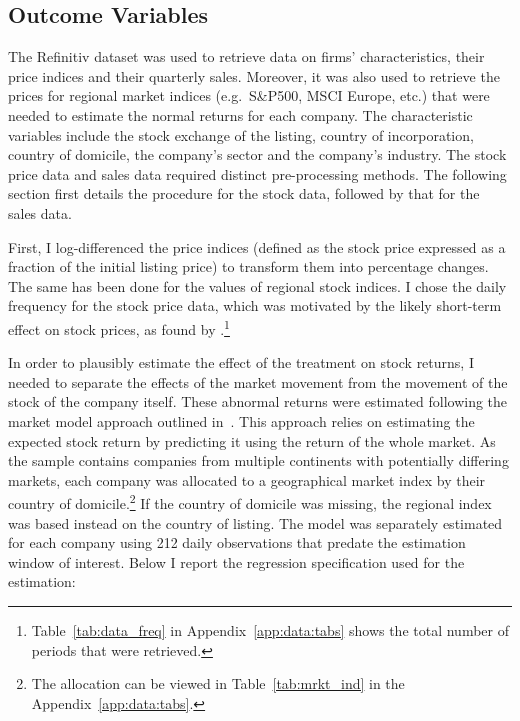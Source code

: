 \documentclass[12pt]{article}
\begin{document}
\subsection{Outcome Variables}

The Refinitiv dataset was used to retrieve data on firms' characteristics, their price indices and their quarterly sales. Moreover, it was also used to retrieve the prices for regional market indices (e.g.\ S\&P500, MSCI Europe, etc.) that were needed to estimate the normal returns for each company. The characteristic variables include the stock exchange of the listing, country of incorporation, country of domicile, the company's sector and the company's industry. The stock price data and sales data required distinct pre-processing methods. The following section first details the procedure for the stock data, followed by that for the sales data.

First, I log-differenced the price indices (defined as the stock price expressed as a fraction of the initial listing price) to transform them into percentage changes. The same has been done for the values of regional stock indices. I chose the daily frequency for the stock price data, which was motivated by the likely short-term effect on stock prices, as found by \textcite{schusterStockPriceReactions2023}.\footnote{Table~\ref{tab:data_freq} in Appendix~\ref{app:data:tabs} shows the total number of periods that were retrieved.}


In order to plausibly estimate the effect of the treatment on stock returns, I needed to separate the effects of the market movement from the movement of the stock of the company itself. These abnormal returns were estimated following the market model approach outlined in~\textcite{mackinlayEventStudiesEconomics1997}. This approach relies on estimating the expected stock return by predicting it using the return of the whole market. As the sample contains companies from multiple continents with potentially differing markets, each company was allocated to a geographical market index by their country of domicile.\footnote{The allocation can be viewed in Table~\ref{tab:mrkt_ind} in the Appendix~\ref{app:data:tabs}.} If the country of domicile was missing, the regional index was based instead on the country of listing. The model was separately estimated for each company using 212 daily observations that predate the estimation window of interest. Below I report the regression specification used for the estimation:
\end{document}

